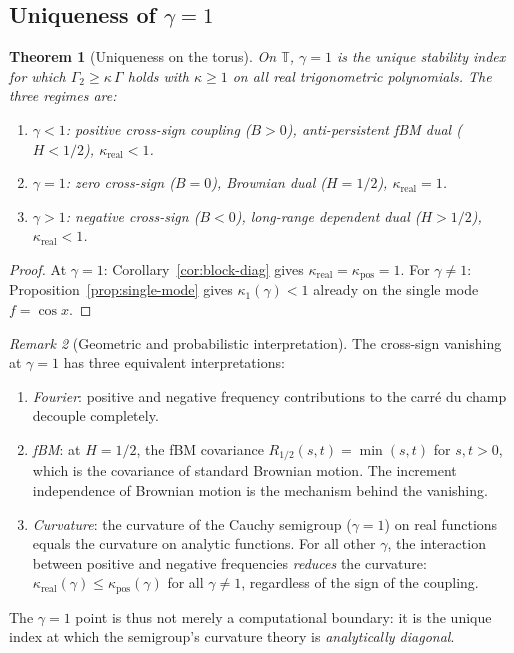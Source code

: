 \documentclass[11pt,a4paper]{article}
\theoremstyle{plain}
\newtheorem{theorem}{Theorem}[section]
\theoremstyle{definition}
\theoremstyle{remark}
\newtheorem{remark}[theorem]{Remark}
\newcommand{\T}{\mathbb{T}}
\begin{document}
\subsection{Uniqueness of $\gamma = 1$}

\begin{theorem}[Uniqueness on the torus]\label{thm:uniqueness}
On $\T$, $\gamma = 1$ is the unique stability index for which
$\Gamma_2 \geq \kappa\,\Gamma$ holds with $\kappa \geq 1$
on all real trigonometric polynomials. The three regimes are:
\begin{enumerate}[label=(\roman*)]
\item $\gamma < 1$: positive cross-sign coupling ($B > 0$),
  anti-persistent fBM dual ($H < 1/2$), $\kappa_{\mathrm{real}} < 1$.
\item $\gamma = 1$: zero cross-sign ($B = 0$),
  Brownian dual ($H = 1/2$), $\kappa_{\mathrm{real}} = 1$.
\item $\gamma > 1$: negative cross-sign ($B < 0$),
  long-range dependent dual ($H > 1/2$), $\kappa_{\mathrm{real}} < 1$.
\end{enumerate}
\end{theorem}

\begin{proof}
At $\gamma = 1$: Corollary~\ref{cor:block-diag} gives
$\kappa_{\mathrm{real}} = \kappa_{\mathrm{pos}} = 1$.
For $\gamma \neq 1$: Proposition~\ref{prop:single-mode} gives
$\kappa_1(\gamma) < 1$ already on the single mode $f = \cos x$.
\end{proof}

\begin{remark}[Geometric and probabilistic interpretation]
\label{rem:geometric}
The cross-sign vanishing at $\gamma = 1$ has three
equivalent interpretations:
\begin{enumerate}[label=(\alph*)]
\item \emph{Fourier}: positive and negative frequency
  contributions to the carr\'e du champ decouple
  completely.
\item \emph{fBM}: at $H = 1/2$, the fBM covariance
  $R_{1/2}(s,t) = \min(s,t)$ for $s,t > 0$, which is
  the covariance of standard Brownian motion.  The
  increment independence of Brownian motion is the
  mechanism behind the vanishing.
\item \emph{Curvature}: the curvature of the Cauchy
  semigroup ($\gamma = 1$) on real functions equals
  the curvature on analytic functions.  For all other
  $\gamma$, the interaction between positive and
  negative frequencies \emph{reduces} the curvature:
  $\kappa_{\mathrm{real}}(\gamma) \leq \kappa_{\mathrm{pos}}(\gamma)$
  for all $\gamma \neq 1$, regardless of the sign of the coupling.
\end{enumerate}
The $\gamma = 1$ point is thus not merely a
computational boundary: it is the unique index at
which the semigroup's curvature theory is
\emph{analytically diagonal}.
\end{remark}
\end{document}
